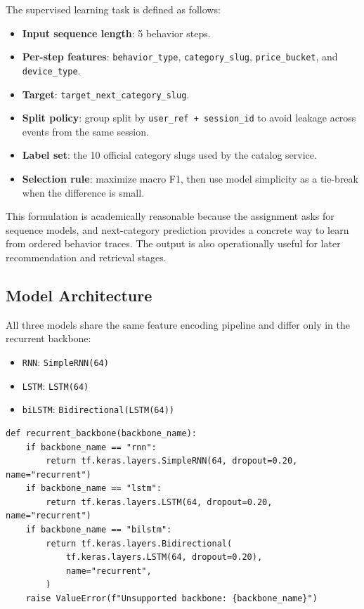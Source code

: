 \documentclass[12pt,a4paper]{article}
\begin{document}
The supervised learning task is defined as follows:
\begin{itemize}
  \item \textbf{Input sequence length}: 5 behavior steps.
  \item \textbf{Per-step features}: \texttt{behavior\_type}, \texttt{category\_slug}, \texttt{price\_bucket}, and \texttt{device\_type}.
  \item \textbf{Target}: \texttt{target\_next\_category\_slug}.
  \item \textbf{Split policy}: group split by \texttt{user\_ref + session\_id} to avoid leakage across events from the same session.
  \item \textbf{Label set}: the 10 official category slugs used by the catalog service.
  \item \textbf{Selection rule}: maximize macro F1, then use model simplicity as a tie-break when the difference is small.
\end{itemize}

This formulation is academically reasonable because the assignment asks for sequence models, and next-category prediction provides a concrete way to learn from ordered behavior traces. The output is also operationally useful for later recommendation and retrieval stages.

\subsection{Model Architecture}
All three models share the same feature encoding pipeline and differ only in the recurrent backbone:
\begin{itemize}
  \item \texttt{RNN}: \texttt{SimpleRNN(64)}
  \item \texttt{LSTM}: \texttt{LSTM(64)}
  \item \texttt{biLSTM}: \texttt{Bidirectional(LSTM(64))}
\end{itemize}

\begin{lstlisting}[caption={Core backbone selection code in the training notebook}]
def recurrent_backbone(backbone_name):
    if backbone_name == "rnn":
        return tf.keras.layers.SimpleRNN(64, dropout=0.20, name="recurrent")
    if backbone_name == "lstm":
        return tf.keras.layers.LSTM(64, dropout=0.20, name="recurrent")
    if backbone_name == "bilstm":
        return tf.keras.layers.Bidirectional(
            tf.keras.layers.LSTM(64, dropout=0.20),
            name="recurrent",
        )
    raise ValueError(f"Unsupported backbone: {backbone_name}")
\end{lstlisting}
\end{document}
